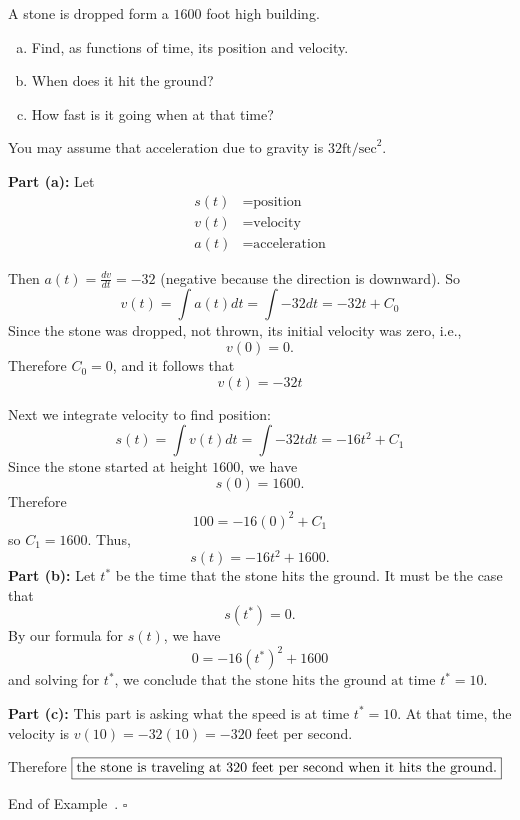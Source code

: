 \documentclass[10pt]{article}
\theoremstyle{definition}
\newtheorem{example}[theorem]{Example}
\renewenvironment{example}
{\begin{oldexample}}
  {\par\smallskip\hfill   End of Example~\theexample. $\square$    \par\end{oldexample}}
\newcommand{\fl}{\noindent\textbf} %
\newcommand{\1}[1]{\textbf{1}_{\left[#1\right]}} %
\begin{document}
\begin{example}
  A stone  is dropped form a $1600$ foot high building.
  \begin{enumerate}[(a)]
    \item Find, as functions of time, its position and velocity.
    \item When does it hit the ground?
    \item How fast is it going when at that time?
  \end{enumerate}
  You may assume that acceleration due to gravity is $32 \mbox{ft/sec}^{2}$.

  \fl{Part (a):} Let
  \begin{align*}
    s(t)&=\mbox{position}\\
    v(t)&=\mbox{velocity}\\
    a(t)&=\mbox{acceleration}
  \end{align*}

  Then $a(t) = \frac{dv}{dt} = -32$ (negative because the direction is downward). So
  \begin{equation*}
    v(t) = \int a(t) dt = \int -32 dt = -32t +C_{0}
  \end{equation*}
  Since the stone was dropped, not thrown, its initial velocity was zero, i.e.,
  \begin{equation*}
    v(0) = 0.
  \end{equation*}
  Therefore $C_{0} =0$, and it follows that
  \begin{equation*}
    \boxed{v(t) = -32t}
  \end{equation*}

  Next we integrate velocity to find position:
  \begin{equation*}
    s(t) = \int v(t)dt = \int -32t dt = -16t^{2}+C_{1}
  \end{equation*}
  Since the stone started at height $1600$, we have
  \begin{equation*}
    s(0) = 1600.
  \end{equation*}
  Therefore
  \begin{equation*}
    100 = -16(0)^{2}+C_{1}
  \end{equation*}
  so $C_{1} = 1600$.
  Thus,
  \begin{equation*}
    \boxed{s(t) = -16t^{2}+1600.}
  \end{equation*}
  \fl{Part (b):} Let $t^{*}$ be the time that the stone hits the ground. It must be the case that
  \begin{equation*}
    s(t^{*}) = 0.
  \end{equation*}
  By our formula for $s(t)$, we have
  \begin{equation*}
    0 = -16(t^{*})^{2}+1600
  \end{equation*}
  and solving for $t^{*}$, we conclude that $\boxed{\text{the stone hits the ground at time } t^{*} =10}$.

  \fl{Part (c):} This part is asking what the speed is at time $t^{*}=10$. At that time, the velocity is
  $v(10)=-32(10)=-320$ feet per second.

  Therefore $\boxed{\text{the stone is traveling at } $320$ \text{ feet per second when it hits the ground.}}$
\end{example}
\end{document}
